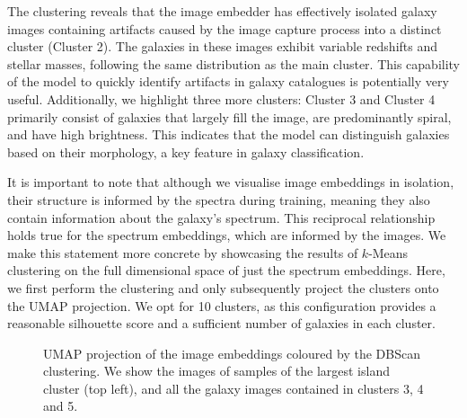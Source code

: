 \documentclass[a4paper,12pt]{article}
\begin{document}
The clustering reveals that the image embedder has effectively isolated galaxy images containing artifacts caused by the image capture process into a distinct cluster (Cluster 2). The galaxies in these images exhibit variable redshifts and stellar masses, following the same distribution as the main cluster. This capability of the model to quickly identify artifacts in galaxy catalogues is potentially very useful. Additionally, we highlight three more clusters: Cluster 3 and Cluster 4 primarily consist of galaxies that largely fill the image, are predominantly spiral, and have high brightness. This indicates that the model can distinguish galaxies based on their morphology, a key feature in galaxy classification.

It is important to note that although we visualise image embeddings in isolation, their structure is informed by the spectra during training, meaning they also contain information about the galaxy's spectrum. This reciprocal relationship holds true for the spectrum embeddings, which are informed by the images. We make this statement more concrete by showcasing the results of $k$-Means clustering on the full dimensional space of just the spectrum embeddings. Here, we first perform the clustering and only subsequently project the clusters onto the UMAP projection. We opt for 10 clusters, as this configuration provides a reasonable silhouette score and a sufficient number of galaxies in each cluster. 


\begin{figure}[H]
    \centering
    \caption{UMAP projection of the image embeddings coloured by the DBScan clustering. We show the images of samples of the largest island cluster (top left), and all the galaxy images contained in clusters 3, 4 and 5.}
    \label{fig:umap_DBSCAN}
\end{figure}
\end{document}
